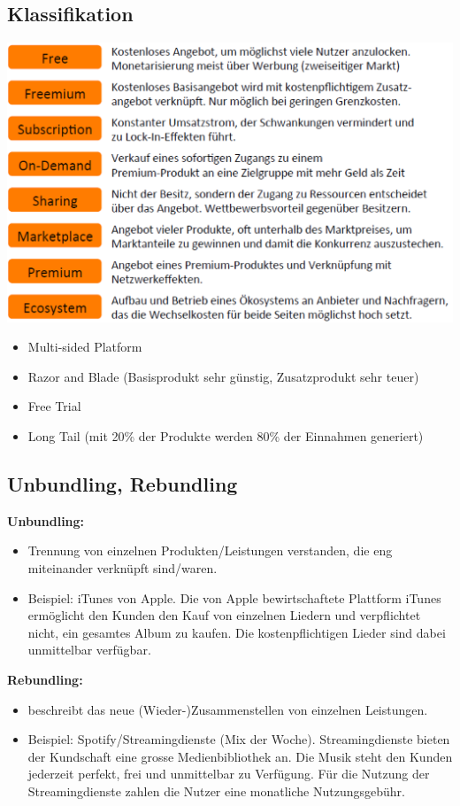 \subsection{Klassifikation}
\begin{multicols}{2}
	\includegraphics[width=1\linewidth]{images/klassifikation}
	\begin{itemize}
		\item Multi-sided Platform
		\item Razor and Blade (Basisprodukt sehr günstig, Zusatzprodukt sehr teuer)
		\item Free Trial
		\item Long Tail (mit 20\% der Produkte werden 80\% der Einnahmen generiert)
	\end{itemize}
\end{multicols}

\subsection{Unbundling, Rebundling}
\textbf{Unbundling:}
\begin{itemize}
	\item Trennung von einzelnen Produkten/Leistungen verstanden, die eng miteinander verknüpft sind/waren.
	\item Beispiel: iTunes von Apple. Die von Apple bewirtschaftete Plattform iTunes ermöglicht den Kunden den Kauf von einzelnen Liedern und verpflichtet nicht, ein gesamtes Album zu kaufen. Die kostenpflichtigen Lieder sind dabei unmittelbar verfügbar.
\end{itemize}
\textbf{Rebundling:}
\begin{itemize}
	\item beschreibt das neue (Wieder-)Zusammenstellen von einzelnen Leistungen.
	\item Beispiel: Spotify/Streamingdienste (Mix der Woche). Streamingdienste bieten der Kundschaft eine grosse Medienbibliothek an. Die Musik steht den Kunden jederzeit perfekt, frei und unmittelbar zu Verfügung. Für die Nutzung der Streamingdienste zahlen die Nutzer eine monatliche Nutzungsgebühr.
\end{itemize}

